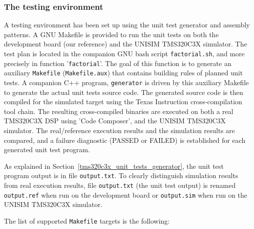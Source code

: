 \newpage
\subsubsection{The testing environment}
\label{tms320c3x_testing_environment}

A testing environment has been set up using the unit test generator and assembly patterns.
A GNU Makefile is provided to run the unit tests on both the development board (our reference) and the UNISIM TMS320C3X simulator.
The test plan is located in the companion GNU bash script \texttt{factorial.sh}, and more precisely in function '\texttt{factorial}'.
The goal of this function is to generate an auxiliary \texttt{Makefile} (\texttt{Makefile.aux}) that contains building rules of planned unit tests.
A companion C++ program, \texttt{generator} is driven by this auxiliary Makefile to generate the actual unit tests source code.
The generated source code is then compiled for the simulated target using the Texas Instruction cross-compilation tool chain.
The resulting cross-compiled binaries are executed on both a real TMS320C3X DSP using 'Code Composer', and the UNISIM TMS320C3X simulator.
The real/reference execution results and the simulation results are compared, and a failure diagnostic (PASSED or FAILED) is established for each generated unit test program.

As explained in Section~\ref{tms320c3x_unit_tests_generator}, the unit test program output is in file \texttt{output.txt}.
To clearly distinguish simulation results from real execution results, file \texttt{output.txt} (the unit test output) is renamed \texttt{output.ref} when run on the development board or \texttt{output.sim} when run on the UNISIM TMS320C3X simulator.

\noindent The list of supported \texttt{Makefile} targets is the following:

